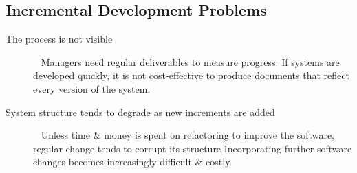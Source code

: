 \documentclass{report}
\begin{document}
\subsection{Incremental Development Problems}
\begin{description}
  \item [The process is not visible] \ \newline
  Managers need regular deliverables to measure progress. If systems are developed quickly, it is not cost-effective to produce documents that reflect every version of the system.
  \item [System structure tends to degrade as new increments are added] \ \newline
  Unless time \& money is spent on refactoring to improve the software, regular change tends to corrupt its structure\newline
  Incorporating further software changes becomes increasingly difficult \& costly.
\end{description}
\end{document}
